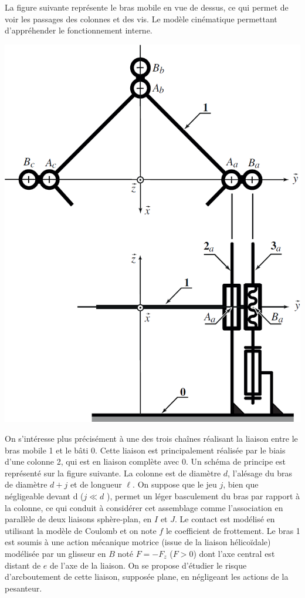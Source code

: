 \documentclass[10pt,fleqn]{article} %
\begin{document}
\begin{multicols}{2}
La figure suivante représente le bras mobile en vue de dessus, ce qui permet de voir les passages des colonnes et
des vis. Le modèle cinématique permettant d’appréhender le fonctionnement interne. 


\begin{center}
\includegraphics[width=.7\linewidth]{images/fig_04}
\end{center}





On s’intéresse plus précisément à une des trois chaînes réalisant la liaison entre le bras mobile 1 et le bâti
0. 
Cette liaison est principalement réalisée par le biais d’une colonne 2, qui est en liaison complète avec 0. Un schéma de principe est représenté sur la figure suivante. La colonne est de diamètre $d$, l’alésage du bras de diamètre
$d + j$ et  de longueur $\ell$. On suppose que le jeu $j$, bien que négligeable devant d ($j  \ll d$ ), permet un léger
basculement du bras par rapport à la colonne, ce qui conduit à considérer cet assemblage comme l’association en parallèle de deux liaisons sphère-plan, en $I$ et $J$. Le contact est modélisé en utilisant la modèle de Coulomb et on note $f$  le coefficient  de frottement. Le bras 1 est soumis à une action mécanique motrice (issue de la
liaison hélicoïdale) modélisée par un glisseur en $B$ noté $F = -F_z$ ($F > 0$) dont l’axe central est distant de $e$
de l’axe de la liaison. On se propose  d’étudier le risque d’arcboutement  de cette liaison, supposée plane, en négligeant les actions de la pesanteur.


\end{multicols}
\end{document}
